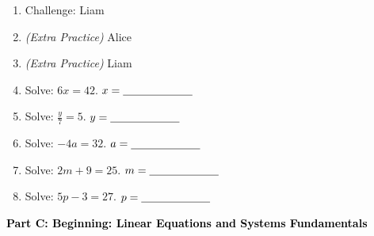 \documentclass[12pt, letterpaper, fleqn]{article}
\newcommand{\blank}{\underline{\hspace{2.2cm}}}
\begin{document}
\begin{enumerate}[itemsep=2.5cm, leftmargin=0.6cm]
\begin{enumerate}[itemsep=2.5cm, leftmargin=0.6cm, resume]
\item Challenge: Liam
\item \textit{(Extra Practice)} Alice
\item \textit{(Extra Practice)} Liam
\item Solve: $6x = 42$.
    \vspace{1cm}
    $x = \blank$
\item Solve: $\frac{y}{7} = 5$.
    \vspace{1cm}
    $y = \blank$
\item Solve: $-4a = 32$.
    \vspace{1cm}
    $a = \blank$
\item Solve: $2m + 9 = 25$.
    \vspace{1cm}
    $m = \blank$
\item Solve: $5p - 3 = 27$.
    \vspace{1cm}
    $p = \blank$
\end{enumerate}

\newpage

\begin{tcolorbox}[colback=customteal!20]
\large\textcolor{black}{\textbf{Part C: Beginning: Linear Equations and Systems Fundamentals}}
\end{tcolorbox}

\vspace{3mm}


\end{enumerate}
\end{document}
